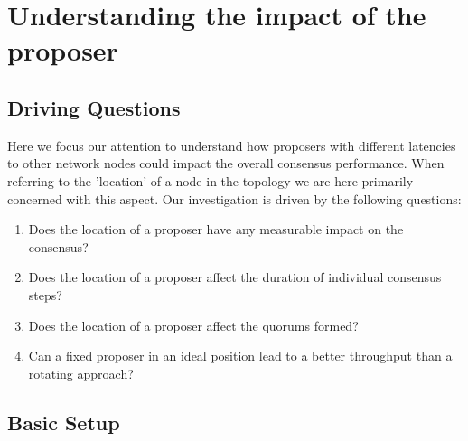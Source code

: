 \section{Understanding the impact of the proposer}
\label{impact}

\subsection{Driving Questions}

Here we focus our attention to understand how proposers with different latencies to other network nodes could impact the overall consensus performance.   When referring to the 'location' of a node in the topology we are here primarily concerned with this aspect.   
Our investigation is driven by the following questions:

\begin{enumerate}[label=(\Roman*)]
    \item Does the location of a proposer have any measurable impact on the consensus? 

    \item Does the location of a proposer affect the duration of individual consensus steps?
    
    \item Does the location of a proposer affect the quorums formed?
    
    \item Can a fixed proposer in an ideal position lead to a better throughput than a rotating approach?  
    
\end{enumerate}


\subsection{Basic Setup}
\label{setup}

